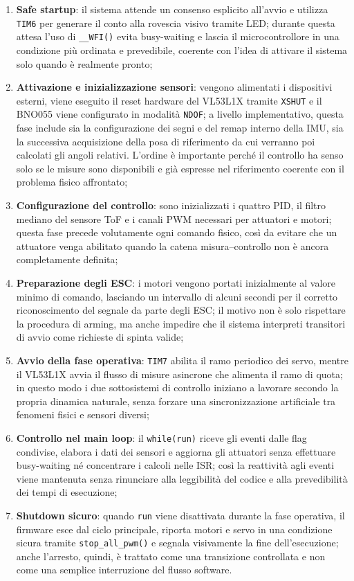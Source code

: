 \documentclass[11pt]{report}
\begin{document}
	\begin{enumerate}
		\item \textbf{Safe startup}: il sistema attende un consenso esplicito all'avvio e utilizza \texttt{TIM6} per generare il conto alla rovescia visivo tramite LED; durante questa attesa l'uso di \texttt{\_\_WFI()} evita busy-waiting e lascia il microcontrollore in una condizione più ordinata e prevedibile, coerente con l'idea di attivare il sistema solo quando è realmente pronto;
		\item \textbf{Attivazione e inizializzazione sensori}: vengono alimentati i dispositivi esterni, viene eseguito il reset hardware del VL53L1X tramite \texttt{XSHUT} e il BNO055 viene configurato in modalità \texttt{NDOF}; a livello implementativo, questa fase include sia la configurazione dei segni e del remap interno della IMU, sia la successiva acquisizione della posa di riferimento da cui verranno poi calcolati gli angoli relativi. L'ordine è importante perché il controllo ha senso solo se le misure sono disponibili e già espresse nel riferimento coerente con il problema fisico affrontato;
		\item \textbf{Configurazione del controllo}: sono inizializzati i quattro PID, il filtro mediano del sensore ToF e i canali PWM necessari per attuatori e motori; questa fase precede volutamente ogni comando fisico, così da evitare che un attuatore venga abilitato quando la catena misura--controllo non è ancora completamente definita;
		\item \textbf{Preparazione degli ESC}: i motori vengono portati inizialmente al valore minimo di comando, lasciando un intervallo di alcuni secondi per il corretto riconoscimento del segnale da parte degli ESC; il motivo non è solo rispettare la procedura di arming, ma anche impedire che il sistema interpreti transitori di avvio come richieste di spinta valide;
		\item \textbf{Avvio della fase operativa}: \texttt{TIM7} abilita il ramo periodico dei servo, mentre il VL53L1X avvia il flusso di misure asincrone che alimenta il ramo di quota; in questo modo i due sottosistemi di controllo iniziano a lavorare secondo la propria dinamica naturale, senza forzare una sincronizzazione artificiale tra fenomeni fisici e sensori diversi;
		\item \textbf{Controllo nel main loop}: il \texttt{while(run)} riceve gli eventi dalle flag condivise, elabora i dati dei sensori e aggiorna gli attuatori senza effettuare busy-waiting né concentrare i calcoli nelle ISR; così la reattività agli eventi viene mantenuta senza rinunciare alla leggibilità del codice e alla prevedibilità dei tempi di esecuzione;
		\item \textbf{Shutdown sicuro}: quando \texttt{run} viene disattivata durante la fase operativa, il firmware esce dal ciclo principale, riporta motori e servo in una condizione sicura tramite \texttt{stop\_all\_pwm()} e segnala visivamente la fine dell'esecuzione; anche l'arresto, quindi, è trattato come una transizione controllata e non come una semplice interruzione del flusso software.
	\end{enumerate}
\end{document}
